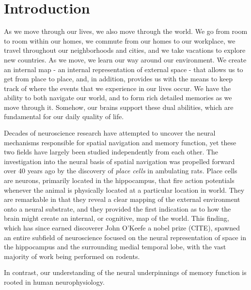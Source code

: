 \chapter{Introduction}



%
%
%

As we move through our lives, we also move through the world. We go from room to room within our homes, we commute from our homes to our workplace, we travel throughout our neighborhoods and cities, and we take vacations to explore new countries. As we move, we learn our way around our environment. We create an internal map - an internal representation of external space - that allows us to get from place to place, and, in addition, provides us with the means to keep track of where the events that we experience in our lives occur. We have the ability to both navigate our world, and to form rich detailed memories as we move through it. Somehow, our brains support these dual abilities, which are fundamental for our daily quality of life.

Decades of neuroscience research have attempted to uncover the neural mechanisms responsible for spatial navigation and memory function, yet these two fields have largely been studied independently from each other. The investigation into the neural basis of spatial navigation was propelled forward over 40 years ago by the discovery of \textit{place cells} \citep{OKeeDost71} in ambulating rats. Place cells are neurons, primarily located in the hippocampus, that fire action potentials whenever the animal is physically located at a particular location in world. They are remarkable in that they reveal a clear mapping of the external environment onto a neural substrate, and they provided the first indication as to how the brain might create an internal, or cognitive, map of the world. This finding, which has since earned discoverer John O'Keefe a nobel prize (CITE), spawned an entire subfield of neuroscience focused on the neural representation of space in the hippocampus and the surrounding medial temporal lobe, with the vast majority of work being performed on rodents.

In contrast, our understanding of the neural underpinnings of memory function is rooted in human neurophysiology. 

